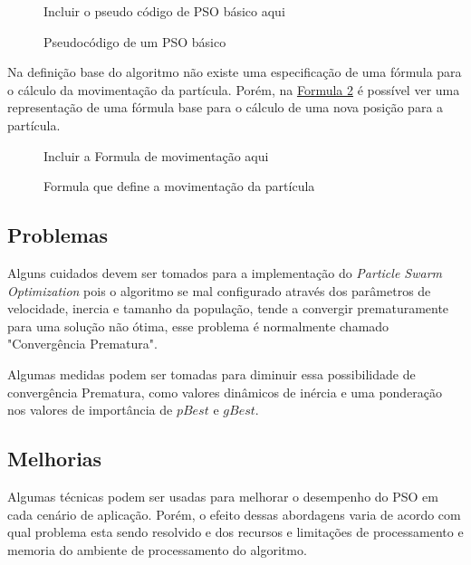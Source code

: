         \begin{figure}[h]
            \centering
            \small{Incluir o pseudo código de PSO básico aqui}
            \caption{Pseudocódigo de um PSO básico}
            \label{alg:pso-base}
        \end{figure}

        Na definição base do algoritmo não existe uma especificação de uma fórmula para o cálculo da movimentação da partícula. Porém, na 
        \hyperref[fig:formula-movimentacao]{Formula \ref{fig:formula-movimentacao}} 
        é possível ver uma representação de uma fórmula base para o cálculo de uma nova posição para a partícula.
                
        \begin{figure}[h]
            \centering
            \small{Incluir a Formula de movimentação aqui}
            \caption{Formula que define a movimentação da partícula}
            \label{fig:formula-movimentacao}
        \end{figure}

    

    \subsection{Problemas}
        Alguns cuidados devem ser tomados para a implementação do \textit{Particle Swarm Optimization} pois o algoritmo se mal configurado através dos parâmetros de velocidade, inercia e tamanho da população, tende a convergir prematuramente para uma solução não ótima, esse problema é normalmente chamado "Convergência Prematura".\newline
        
        Algumas medidas podem ser tomadas para diminuir essa possibilidade de convergência Prematura, como valores dinâmicos de inércia e uma ponderação nos valores de importância de $pBest$ e $gBest$.


    \subsection{Melhorias}
            Algumas técnicas podem ser usadas para melhorar o desempenho do PSO em cada cenário de aplicação. Porém, o efeito dessas abordagens varia de acordo com qual problema esta sendo resolvido e dos recursos e limitações de processamento e memoria do ambiente de processamento do algoritmo.

